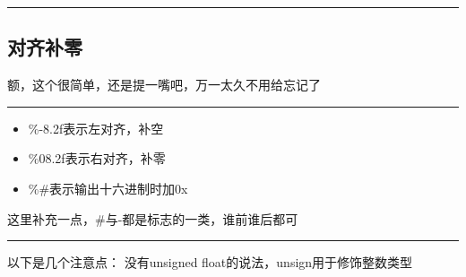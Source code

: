 \documentclass{ctexart}%
\begin{document}
\vspace{6pt}
\hrule
\subsection{对齐补零}
额，这个很简单，还是提一嘴吧，万一太久不用给忘记了

\vspace{6pt}
\hrule
\vspace{6pt}
\begin{itemize}
    \item \%-8.2f表示左对齐，补空
    \item \%08.2f表示右对齐，补零
    \item \%\#表示输出十六进制时加0x
\end{itemize}

这里补充一点，\#与-都是标志的一类，谁前谁后都可

\vspace{3pt}
\hrule
以下是几个注意点：
没有unsigned float的说法，unsign用于修饰整数类型
\end{document}
